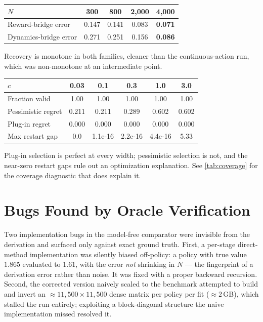 \begin{center}\small
\begin{tabular}{@{}lcccc@{}}
\toprule
$N$ & 300 & 800 & 2{,}000 & 4{,}000 \\
\midrule
Reward-bridge error & 0.147 & 0.141 & 0.083 & \textbf{0.071} \\
Dynamics-bridge error & 0.271 & 0.251 & 0.156 & \textbf{0.086} \\
\bottomrule
\end{tabular}
\end{center}

Recovery is monotone in both families, cleaner than the continuous-action run,
which was non-monotone at an intermediate point.

\begin{center}\small
\begin{tabular}{@{}lccccc@{}}
\toprule
$c$ & 0.03 & 0.1 & 0.3 & 1.0 & 3.0 \\
\midrule
Fraction valid & 1.00 & 1.00 & 1.00 & 1.00 & 1.00 \\
Pessimistic regret & 0.211 & 0.211 & 0.289 & 0.602 & 0.602 \\
Plug-in regret & 0.000 & 0.000 & 0.000 & 0.000 & 0.000 \\
Max restart gap & 0.0 & 1.1e-16 & 2.2e-16 & 4.4e-16 & 5.33 \\
\bottomrule
\end{tabular}
\end{center}

Plug-in selection is perfect at every width; pessimistic selection is not, and
the near-zero restart gaps rule out an optimization explanation. See
\cref{tab:coverage} for the coverage diagnostic that does explain it.

\section{Bugs Found by Oracle Verification}
\label{app:bugs}

Two implementation bugs in the model-free comparator were invisible from the
derivation and surfaced only against exact ground truth. First, a per-stage
direct-method implementation was silently biased off-policy: a policy with true
value $1.865$ evaluated to $1.61$, with the error \emph{not} shrinking in $N$ ---
the fingerprint of a derivation error rather than noise. It was fixed with a
proper backward recursion. Second, the corrected version naively scaled to the
benchmark attempted to build and invert an $\approx\!11{,}500 \times 11{,}500$
dense matrix per policy per fit ($\approx\!2$\,GB), which stalled the run
entirely; exploiting a block-diagonal structure the naive implementation missed
resolved it.

